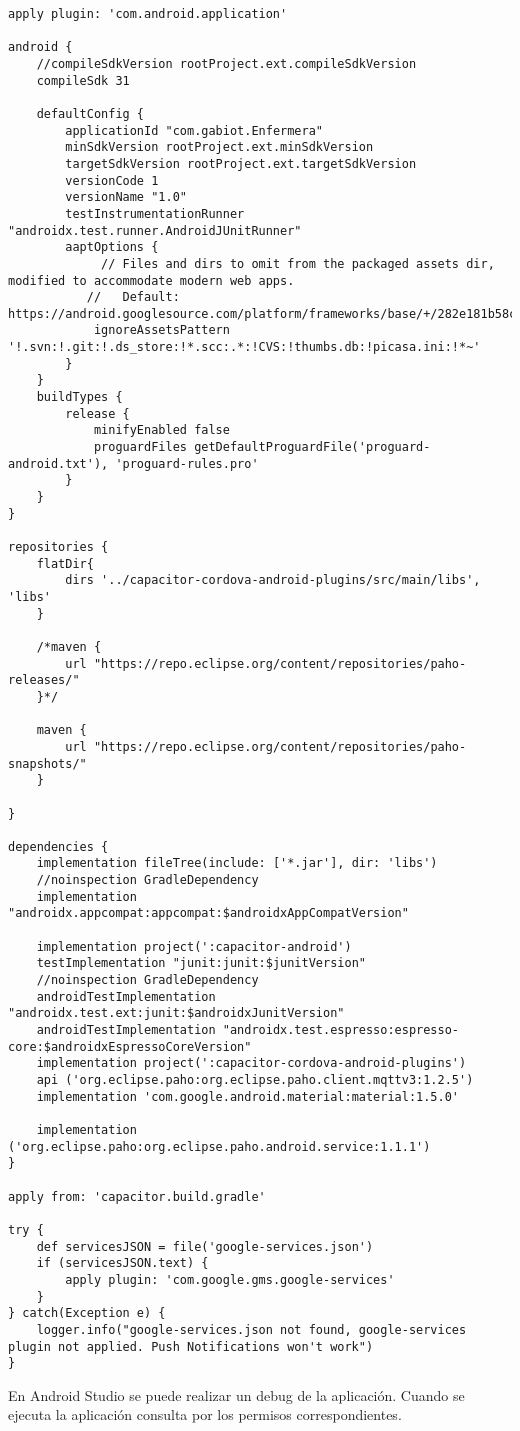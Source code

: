 \begin{lstlisting}[label=cod:buildGradle,caption= Archivo build.gradle(Module:android.app).]  
apply plugin: 'com.android.application'

android {
    //compileSdkVersion rootProject.ext.compileSdkVersion
    compileSdk 31

    defaultConfig {
        applicationId "com.gabiot.Enfermera"
        minSdkVersion rootProject.ext.minSdkVersion
        targetSdkVersion rootProject.ext.targetSdkVersion
        versionCode 1
        versionName "1.0"
        testInstrumentationRunner "androidx.test.runner.AndroidJUnitRunner"
        aaptOptions {
             // Files and dirs to omit from the packaged assets dir, modified to accommodate modern web apps.
           //   Default: https://android.googlesource.com/platform/frameworks/base/+/282e181b58cf72b6ca770dc7ca5f91f135444502/tools/aapt/AaptAssets.cpp#61
            ignoreAssetsPattern '!.svn:!.git:!.ds_store:!*.scc:.*:!CVS:!thumbs.db:!picasa.ini:!*~'
        }
    }
    buildTypes {
        release {
            minifyEnabled false
            proguardFiles getDefaultProguardFile('proguard-android.txt'), 'proguard-rules.pro'
        }
    }
}

repositories {
    flatDir{
        dirs '../capacitor-cordova-android-plugins/src/main/libs', 'libs'
    }

    /*maven {
        url "https://repo.eclipse.org/content/repositories/paho-releases/"
    }*/

    maven {
        url "https://repo.eclipse.org/content/repositories/paho-snapshots/"
    }

}

dependencies {
    implementation fileTree(include: ['*.jar'], dir: 'libs')
    //noinspection GradleDependency
    implementation "androidx.appcompat:appcompat:$androidxAppCompatVersion"

    implementation project(':capacitor-android')
    testImplementation "junit:junit:$junitVersion"
    //noinspection GradleDependency
    androidTestImplementation "androidx.test.ext:junit:$androidxJunitVersion"
    androidTestImplementation "androidx.test.espresso:espresso-core:$androidxEspressoCoreVersion"
    implementation project(':capacitor-cordova-android-plugins')
    api ('org.eclipse.paho:org.eclipse.paho.client.mqttv3:1.2.5')
    implementation 'com.google.android.material:material:1.5.0'

    implementation ('org.eclipse.paho:org.eclipse.paho.android.service:1.1.1')
}

apply from: 'capacitor.build.gradle'

try {
    def servicesJSON = file('google-services.json')
    if (servicesJSON.text) {
        apply plugin: 'com.google.gms.google-services'
    }
} catch(Exception e) {
    logger.info("google-services.json not found, google-services plugin not applied. Push Notifications won't work")
}
\end{lstlisting}


En Android Studio se puede realizar un debug de la aplicación.
Cuando se ejecuta la aplicación consulta por los permisos correspondientes.
